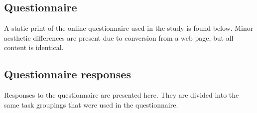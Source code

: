 \begin{appendices}
\makeatletter
\renewcommand{\thesubsection}{\@arabic\c@subsection}  %
\makeatother

\subsection{Questionnaire}
\label{appendix:questionnaire}

A static print of the online questionnaire used in the study is found below.
Minor aesthetic differences are present due to conversion from a web page,
but all content is identical.



\subsection{Questionnaire responses}
\label{appendix:questionnaire responses}

Responses to the questionnaire are presented here.
They are divided into the same task groupings that were used in the questionnaire.


\end{appendices}
